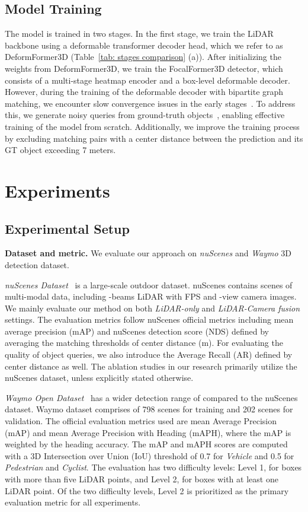 \documentclass[10pt,twocolumn,letterpaper]{article}
\begin{document}
\subsection{Model Training}
\label{sec:training}
The model is trained in two stages. In the first stage, we train the LiDAR backbone using a deformable transformer decoder head, which we refer to as DeformFormer3D (Table~\ref{tab: stages comparison} (a)).
After initializing the weights from DeformFormer3D, we train the FocalFormer3D detector, which consists of a multi-stage heatmap encoder and a box-level deformable decoder. However, during the training of the deformable decoder with bipartite graph matching, we encounter slow convergence issues in the early stages~\cite{dndetr}. To address this, we generate noisy queries from ground-truth objects~\cite{cmt, dndetr, dino}, enabling effective training of the model from scratch. Additionally, we improve the training process by excluding matching pairs with a center distance between the prediction and its GT object exceeding 7 meters.

\section{Experiments}

\subsection{Experimental Setup}

\vspace{1mm}
\noindent\textbf{Dataset and metric.} We evaluate our approach on \textit{nuScenes} and \textit{Waymo} 3D detection dataset.

\textit{nuScenes Dataset}~\cite{nuscenes} is a large-scale outdoor dataset. nuScenes contains  scenes of multi-modal data, including -beams LiDAR with FPS and -view camera images. We mainly evaluate our method on both \textit{LiDAR-only} and \textit{LiDAR-Camera fusion} settings. The evaluation metrics follow nuScenes official metrics including mean average precision (mAP) and nuScenes detection score (NDS) defined by averaging the matching thresholds of center distance  (m). For evaluating the quality of object queries, we also introduce the Average Recall (AR) defined by center distance as well. The ablation studies in our research primarily utilize the nuScenes dataset, unless explicitly stated otherwise.

\textit{Waymo Open Dataset}~\cite{waymo} has a wider detection range of  compared to the nuScenes dataset. Waymo dataset comprises of 798 scenes for training and 202 scenes for validation. The official evaluation metrics used are mean Average Precision (mAP) and mean Average Precision with Heading (mAPH), where the mAP is weighted by the heading accuracy. The mAP and mAPH scores are computed with a 3D Intersection over Union (IoU) threshold of 0.7 for \textit{Vehicle} and 0.5 for \textit{Pedestrian} and \textit{Cyclist}. The evaluation has two difficulty levels: Level 1, for boxes with more than five LiDAR points, and Level 2, for boxes with at least one LiDAR point. Of the two difficulty levels, Level 2 is prioritized as the primary evaluation metric for all experiments. 
\end{document}
